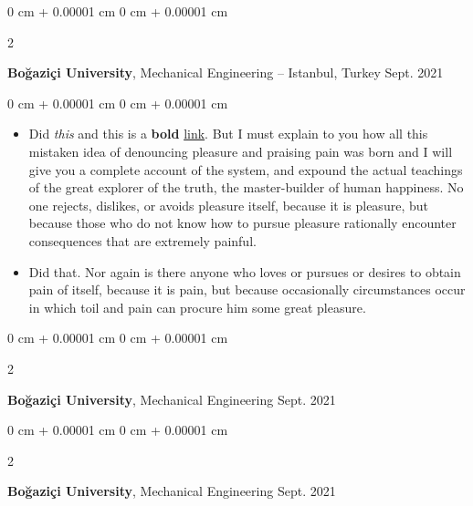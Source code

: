 \documentclass[10pt, letterpaper]{article}
\newenvironment{highlights}{
    \begin{itemize}[
        topsep=0.10 cm,
        parsep=0.10 cm,
        partopsep=0pt,
        itemsep=0pt,
        leftmargin=0 cm + 10pt
    ]
}{
    \end{itemize}
} %
\newenvironment{onecolentry}{
    \begin{adjustwidth}{
        0 cm + 0.00001 cm
    }{
        0 cm + 0.00001 cm
    }
}{
    \end{adjustwidth}
} %
\newenvironment{twocolentry}[2][]{
    \onecolentry
    \def\secondColumn{#2}
    \setcolumnwidth{\fill, 4.5 cm}
    \begin{paracol}{2}
}{
    \switchcolumn \raggedleft \secondColumn
    \end{paracol}
    \endonecolentry
} %
\begin{document}
        \begin{twocolentry}{
            Sept. 2021
        }
            \textbf{Boğaziçi University}, Mechanical Engineering -- Istanbul, Turkey\end{twocolentry}

        \vspace{0.10 cm}
        \begin{onecolentry}
            \begin{highlights}
                \item Did \textit{this} and this is a \textbf{bold} \href{https://example.com}{link}. But I must explain to you how all this mistaken idea of denouncing pleasure and praising pain was born and I will give you a complete account of the system, and expound the actual teachings of the great explorer of the truth, the master-builder of human happiness. No one rejects, dislikes, or avoids pleasure itself, because it is pleasure, but because those who do not know how to pursue pleasure rationally encounter consequences that are extremely painful.
                \item Did that. Nor again is there anyone who loves or pursues or desires to obtain pain of itself, because it is pain, but because occasionally circumstances occur in which toil and pain can procure him some great pleasure.
            \end{highlights}
        \end{onecolentry}


        \vspace{0.2 cm}

        \begin{twocolentry}{
            Sept. 2021
        }
            \textbf{Boğaziçi University}, Mechanical Engineering\end{twocolentry}



        \vspace{0.2 cm}

        \begin{twocolentry}{
            Sept. 2021
        }
            \textbf{Boğaziçi University}, Mechanical Engineering\end{twocolentry}
\end{document}

